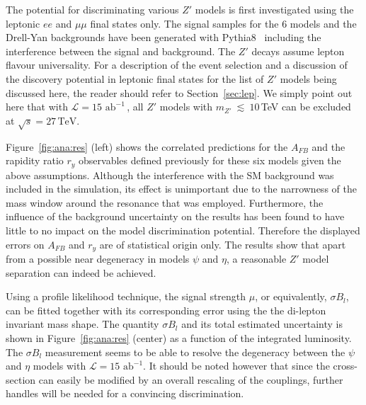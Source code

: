 \documentclass[a4paper,11pt]{article}
\newcommand*{\intlumihelhc}{\ensuremath{\mathcal{L}=15\,\text{ab}^{-1}}}
\newcommand*{\sqrtshelhc}{\ensuremath{\sqrt{s}=27\,\text{TeV}}}
\renewcommand*{\intlumihelhc}{\ensuremath{\mathcal{L}=15\text{ ab}^{-1}}}
\newcommand{\py}{{\sc Pythia8}}
\begin{document}
The potential for discriminating various $Z'$ models is first investigated using the leptonic $ee$ and $\mu\mu$ final states only. The signal samples for the 6 models and the Drell-Yan backgrounds have been generated with \py~\cite{Sjostrand:2014zea} including the interference between the signal and background. The $Z'$ decays assume lepton flavour universality. For a description of the event selection and a discussion of the discovery potential in leptonic final states for the list of $Z'$ models being discussed here, the reader should refer to Section~\ref{sec:lep}. We simply point out here that with \intlumihelhc\,, all $Z'$ models with $m_{Z'}~\lesssim~10$\,TeV can be excluded at \sqrtshelhc.

Figure~\ref{fig:ana:res} (left) shows the correlated predictions for the $A_{FB}$ and the rapidity ratio $r_y$ observables defined previously for these six models given the above assumptions. Although the interference with the SM background was included in the simulation, its effect is unimportant due to the narrowness of the mass window around the resonance that was employed. Furthermore, the influence of the background uncertainty on the results has been found to have little to no impact on the model discrimination potential. Therefore the displayed errors on $A_{FB}$ and $r_y$ are of statistical origin only. The results show that apart from a possible near degeneracy in models $\psi$ and $\eta$, a reasonable $Z'$ model separation can indeed be achieved.

Using a profile likelihood technique, the signal strength $\mu$, or equivalently, $\sigma B_l$, can be fitted together with its corresponding error using the the di-lepton invariant mass shape. The quantity $\sigma B_l$ and its total estimated uncertainty is shown in Figure~\ref{fig:ana:res} (center) as a function of the integrated luminosity. The $\sigma B_l$ measurement seems to be able to resolve the degeneracy between the $\psi$ and $\eta$ models with \intlumihelhc. It should be noted however that since the cross-section can easily be modified by an overall rescaling of the couplings, further handles will be needed for a convincing discrimination.
\end{document}
